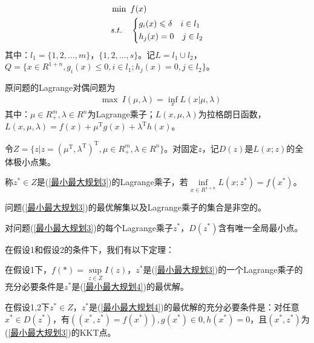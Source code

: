     \begin{align}
    \label{最小最大规划3}
    &\mathop{\min}\ f(x)\\
    &s.t.\quad \left\{
    \begin{aligned}
    &g_i(x)\leqslant \delta \quad i\in l_1\notag \\
    &h_j(x)=0 \quad j\in l_2\notag
    \end{aligned}
        \right.
    \end{align}
    其中：$l_1=\{1,2,\ldots,m\}$，$\{1,2,\ldots,s\}$。记$L=l_1 \cup l_2$，$Q=\{x\in R^{1+n},g_i(x)\leqslant 0,i\in l_1;h_j(x)=0,j \in l_2\}$。
    \par
    原问题的Lagrange对偶问题为
    \begin{align}
    \label{最小最大规划4}
    &\mathop{\max}\  I(\mu,\lambda)=\mathop{\inf}\limits_{x}L(x|\mu,\lambda)
    \end{align}
    其中：$\mu\in R_{+}^m,\lambda\in R^n$为Lagrange乘子；$L(x,\mu,\lambda)$为拉格朗日函数，$L(x,\mu,\lambda)=f(x)+\mu^\mathrm{T} g(x)+\lambda^\mathrm{T} h(x)$。
    \par
    令$Z=\{z|z=(\mu^\mathrm{T} ,\lambda^\mathrm{T} )^\mathrm{T} ,\mu\in R_{+}^m,\lambda\in R^n\}$。对固定$z$，记$D(z)$是$L(x;z)$的全体极小点集。
    \begin{definition}
    称$z^*\in Z$是(\ref{最小最大规划3})的Lagrange乘子，若$\mathop{\inf}\limits_{x\in R^{1+n}}L(x;z^*)=f(x^*)$。
    \end{definition}
    \begin{Assumption}[1]
    问题(\ref{最小最大规划3})的最优解集以及Lagrange乘子的集合是非空的。
    \end{Assumption}
    \begin{Assumption}[2]
    对问题(\ref{最小最大规划3})的每个Lagrange乘子$z^*$，$D(z^*)$含有唯一全局最小点。
    \end{Assumption}
    \par
    在假设1和假设2的条件下，我们有以下定理：
    \begin{theorem}
    在假设1下，$f(*)=\mathop{\sup}\limits_{z\in Z}I(z)$，$z^*$是(\ref{最小最大规划3})的一个Lagrange乘子的充分必要条件是$z^*$是(\ref{最小最大规划4})的最优解。
    \end{theorem}
    \begin{theorem}
    在假设1,2下$z^*\in Z$，$z^*$是(\ref{最小最大规划4})的最优解的充分必要条件是：对任意$x^*\in D(z^*)$，有$((x^*,z^*)=f(x^*)),g(x^*)\in 0,h(x^*)=0$，且$(x^*,z^*)$为(\ref{最小最大规划3})的KKT点。
    \end{theorem}
